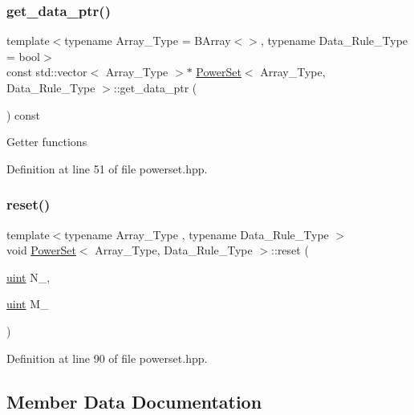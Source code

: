 \subsubsection{\texorpdfstring{get\+\_\+data\+\_\+ptr()}{get\_data\_ptr()}}
{\footnotesize\ttfamily template$<$typename Array\+\_\+\+Type  = B\+Array$<$$>$, typename Data\+\_\+\+Rule\+\_\+\+Type  = bool$>$ \\
const std\+::vector$<$ Array\+\_\+\+Type $>$$\ast$ \hyperlink{class_power_set}{Power\+Set}$<$ Array\+\_\+\+Type, Data\+\_\+\+Rule\+\_\+\+Type $>$\+::get\+\_\+data\+\_\+ptr (\begin{DoxyParamCaption}{ }\end{DoxyParamCaption}) const\hspace{0.3cm}{\ttfamily [inline]}}

Getter functions 

Definition at line 51 of file powerset.\+hpp.

\mbox{\label{class_power_set_aba11dd8802cd2eb529c7c30b55994248}} 
\subsubsection{\texorpdfstring{reset()}{reset()}}
{\footnotesize\ttfamily template$<$typename Array\+\_\+\+Type , typename Data\+\_\+\+Rule\+\_\+\+Type $>$ \\
void \hyperlink{class_power_set}{Power\+Set}$<$ Array\+\_\+\+Type, Data\+\_\+\+Rule\+\_\+\+Type $>$\+::reset (\begin{DoxyParamCaption}\item[{\hyperlink{typedefs_8hpp_a91ad9478d81a7aaf2593e8d9c3d06a14}{uint}}]{N\+\_\+,  }\item[{\hyperlink{typedefs_8hpp_a91ad9478d81a7aaf2593e8d9c3d06a14}{uint}}]{M\+\_\+ }\end{DoxyParamCaption})\hspace{0.3cm}{\ttfamily [inline]}}



Definition at line 90 of file powerset.\+hpp.



\subsection{Member Data Documentation}
\mbox{\label{class_power_set_a90e8607cc6834f140d221b3448593ab9}} 
